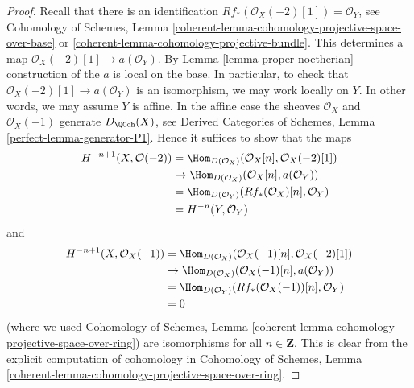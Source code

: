 \begin{proof}
Recall that there is an identification
$Rf_*(\mathcal{O}_X(-2)[1]) = \mathcal{O}_Y$, see
Cohomology of Schemes, Lemma
\ref{coherent-lemma-cohomology-projective-space-over-base} or
\ref{coherent-lemma-cohomology-projective-bundle}.
This determines a map $\mathcal{O}_X(-2)[1] \to a(\mathcal{O}_Y)$.
By Lemma \ref{lemma-proper-noetherian} construction of the $a$
is local on the base. In particular, to check that
$\mathcal{O}_X(-2)[1] \to a(\mathcal{O}_Y)$ is an isomorphism, we
may work locally on $Y$. In other words, we may assume $Y$ is affine.
In the affine case the sheaves $\mathcal{O}_X$ and $\mathcal{O}_X(-1)$
generate $D_\QCoh(X)$, see
Derived Categories of Schemes, Lemma \ref{perfect-lemma-generator-P1}.
Hence it suffices to show that the maps
\begin{align*}
H^{-n + 1}(X, \mathcal{O}(-2))
& = 
\Hom_{D(\mathcal{O}_X)}(\mathcal{O}_X[n], \mathcal{O}_X(-2)[1]) \\
& \to
\Hom_{D(\mathcal{O}_X)}(\mathcal{O}_X[n], a(\mathcal{O}_Y)) \\
& =
\Hom_{D(\mathcal{O}_Y)}(Rf_*(\mathcal{O}_X)[n], \mathcal{O}_Y) \\
& =
H^{-n}(Y, \mathcal{O}_Y)
\end{align*}
and
\begin{align*}
H^{-n + 1}(X, \mathcal{O}_X(-1))
& = 
\Hom_{D(\mathcal{O}_X)}(\mathcal{O}_X(-1)[n], \mathcal{O}_X(-2)[1]) \\
& \to
\Hom_{D(\mathcal{O}_X)}(\mathcal{O}_X(-1)[n], a(\mathcal{O}_Y)) \\
& =
\Hom_{D(\mathcal{O}_Y)}(Rf_*(\mathcal{O}_X(-1))[n], \mathcal{O}_Y) \\
& = 0
\end{align*}
(where we used Cohomology of Schemes, Lemma
\ref{coherent-lemma-cohomology-projective-space-over-ring})
are isomorphisms for all $n \in \mathbf{Z}$. This is clear from
the explicit computation of cohomology in
Cohomology of Schemes, Lemma
\ref{coherent-lemma-cohomology-projective-space-over-ring}.
\end{proof}

